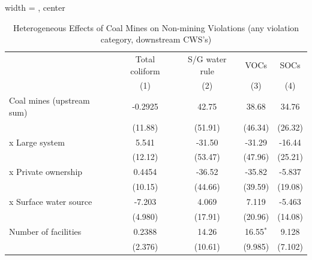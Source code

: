 
\begin{table}[htbp]
   
   \caption{\label{tab:2sls_het_unified_nonminevio_ivsum_allcat} Heterogeneous Effects of Coal Mines on Non-mining Violations (any violation category, downstream CWS's)}
   \bigskip
   
   \centering
   
   \begin{adjustbox}{width = \textwidth, center}
      
      
      \begin{tabular}{lcccc}
         \toprule
         
                                                       & Total coliform & S/G water rule & VOCs          & SOCs\\  
         
                                                       & (1)            & (2)            & (3)           & (4)\\  
         
         \midrule 
         Coal mines (upstream sum)                     & -0.2925        & 42.75          & 38.68         & 34.76\\   
                                                       & (11.88)        & (51.91)        & (46.34)       & (26.32)\\   
           x Large system                              & 5.541          & -31.50         & -31.29        & -16.44\\   
                                                       & (12.12)        & (53.47)        & (47.96)       & (25.21)\\   
           x Private ownership                         & 0.4454         & -36.52         & -35.82        & -5.837\\   
                                                       & (10.15)        & (44.66)        & (39.59)       & (19.08)\\   
           x Surface water source                      & -7.203         & 4.069          & 7.119         & -5.463\\   
                                                       & (4.980)        & (17.91)        & (20.96)       & (14.08)\\   
         Number of facilities                          & 0.2388         & 14.26          & 16.55$^{*}$   & 9.128\\   
                                                       & (2.376)        & (10.61)        & (9.985)       & (7.102)\\   
         

\end{tabular}
\end{adjustbox}
\end{table}
